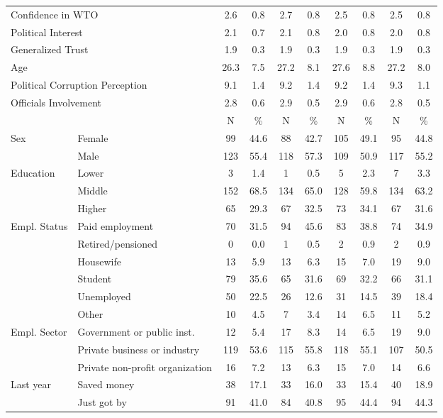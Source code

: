 \documentclass[11pt, ngerman,english,a4]{article}
\begin{document}
\begin{table}[!htbp]
{\begin{tabular}[t]{llcccccccc}
\multicolumn{2}{l}{Confidence in WTO} & 2.6 & 0.8 & 2.7 & 0.8 & 2.5 & 0.8 & 2.5 & 0.8\\
\multicolumn{2}{l}{Political Interest }   & 2.1 & 0.7 & 2.1 & 0.8 & 2.0 & 0.8 & 2.0 & 0.8\\
\multicolumn{2}{l}{Generalized Trust }  & 1.9 & 0.3 & 1.9 & 0.3 & 1.9 & 0.3 & 1.9 & 0.3\\
\multicolumn{2}{l}{Age }  & 26.3 & 7.5 & 27.2 & 8.1 & 27.6 & 8.8 & 27.2 & 8.0\\
\multicolumn{2}{l}{Political Corruption Perception }   & 9.1 & 1.4 & 9.2 & 1.4 & 9.2 & 1.4 & 9.3 & 1.1\\
\multicolumn{2}{l}{Officials Involvement }   & 2.8 & 0.6 & 2.9 & 0.5 & 2.9 & 0.6 & 2.8 & 0.5\\
\midrule
 &  & N & \% & N & \% & N & \% & N & \%\\
\cmidrule(l{1pt}r{3pt}){3-10}
Sex & Female & 99 & 44.6 & 88 & 42.7 & 105 & 49.1 & 95 & 44.8\\
 & Male & 123 & 55.4 & 118 & 57.3 & 109 & 50.9 & 117 & 55.2\\
Education & Lower & 3 & 1.4 & 1 & 0.5 & 5 & 2.3 & 7 & 3.3\\
 & Middle & 152 & 68.5 & 134 & 65.0 & 128 & 59.8 & 134 & 63.2\\
 & Higher & 65 & 29.3 & 67 & 32.5 & 73 & 34.1 & 67 & 31.6\\
Empl. Status & Paid employment & 70 & 31.5 & 94 & 45.6 & 83 & 38.8 & 74 & 34.9\\
 & Retired/pensioned & 0 & 0.0 & 1 & 0.5 & 2 & 0.9 & 2 & 0.9\\
 & Housewife & 13 & 5.9 & 13 & 6.3 & 15 & 7.0 & 19 & 9.0\\
 & Student & 79 & 35.6 & 65 & 31.6 & 69 & 32.2 & 66 & 31.1\\
 & Unemployed & 50 & 22.5 & 26 & 12.6 & 31 & 14.5 & 39 & 18.4\\
 & Other & 10 & 4.5 & 7 & 3.4 & 14 & 6.5 & 11 & 5.2\\
Empl. Sector & Government or public inst. & 12 & 5.4 & 17 & 8.3 & 14 & 6.5 & 19 & 9.0\\
 & Private business or industry & 119 & 53.6 & 115 & 55.8 & 118 & 55.1 & 107 & 50.5\\
 & Private non-profit organization & 16 & 7.2 & 13 & 6.3 & 15 & 7.0 & 14 & 6.6\\
Last year & Saved money & 38 & 17.1 & 33 & 16.0 & 33 & 15.4 & 40 & 18.9\\
 & Just got by & 91 & 41.0 & 84 & 40.8 & 95 & 44.4 & 94 & 44.3\\

\end{tabular}}
\end{table}
\end{document}
